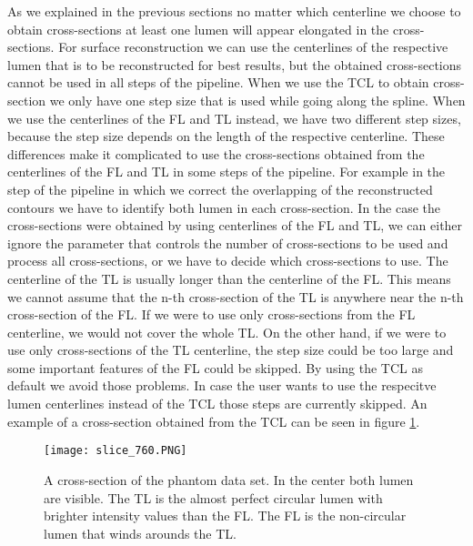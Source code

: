 \documentclass[thesis.tex]{subfiles}
\begin{document}
As we explained in the previous sections no matter which centerline we choose to obtain cross-sections at least one lumen will appear elongated in the cross-sections. For surface reconstruction we can use the centerlines of the respective lumen that is to be reconstructed for best results, but the obtained cross-sections cannot be used in all steps of the pipeline. 
When we use the TCL to obtain cross-section we only have one step size that is used while going along the spline. When we use the centerlines of the FL and TL instead, we have two different step sizes, because the step size depends on the length of the respective centerline. These differences make it complicated to use the cross-sections obtained from the centerlines of the FL and TL in some steps of the pipeline. For example in the step of the pipeline in which we correct the overlapping of the reconstructed contours we have to identify both lumen in each cross-section. In the case the cross-sections were obtained by using centerlines of the FL and TL, we can either ignore the parameter that controls the number of cross-sections to be used and process all cross-sections, or we have to decide which cross-sections to use.
The centerline of the TL is usually longer than the centerline of the FL. This means we cannot assume that the n-th cross-section of the TL is anywhere near the n-th cross-section of the FL. If we were to use only cross-sections from the FL centerline, we would not cover the whole TL. On the other hand, if we were to use only cross-sections of the TL centerline, the step size could be too large and some important features of the FL could be skipped. By using the TCL as default we avoid those problems. In case the user wants to use the respecitve lumen centerlines instead of the TCL those steps are currently skipped. An example of a cross-section obtained from the TCL can be seen in figure \ref{fig:cross-section}.

\begin{figure}[h]
\centering
\texttt{[image: slice\_760.PNG]}
\caption{A cross-section of the phantom data set. In the center both lumen are visible. The TL is the almost perfect circular lumen with brighter intensity values than the FL. The FL is the non-circular lumen that winds arounds the TL.}
\label{fig:cross-section}
\end{figure}  

\end{document}
